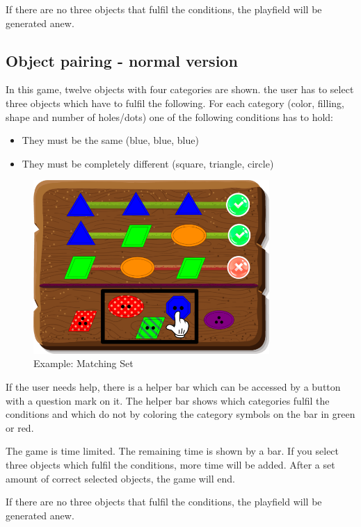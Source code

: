 If there are no three objects that fulfil the conditions, the playfield will be generated anew.

\subsection{Object pairing - normal version}\label{subsec:object-pairing---normal-version}
In this game, twelve objects with four categories are shown.
the user has to select three objects which have to fulfil the following.
For each category (color, filling, shape and number of holes/dots) one of the following conditions has to hold:
\begin{itemize}
    \item They must be the same (blue, blue, blue)
    \item They must be completely different (square, triangle, circle)
\end{itemize}

\begin{figure}[H]
    \centering
    \includegraphics[width=0.8\textwidth]{figures/setexample}
    \caption{Example: Matching Set}
    \label{fig:setexample2}
\end{figure}

If the user needs help, there is a helper bar which can be accessed by a button with a question mark on it.
The helper bar shows which categories fulfil the conditions and which do not
by coloring the category symbols on the bar in green or red.

The game is time limited. The remaining time is shown by a bar.
If you select three objects which fulfil the conditions, more time will be added.
After a set amount of correct selected objects, the game will end.

If there are no three objects that fulfil the conditions, the playfield will be generated anew.

